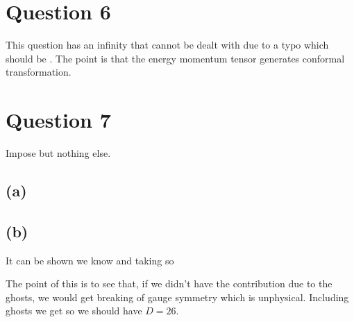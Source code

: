 \documentclass{article}
\begin{document}
\section*{Question 6}

This question has an infinity that cannot be dealt with due to a typo
which should be 
.
The point is that the energy momentum tensor generates conformal transformation. 


\section*{Question 7}

Impose 
but nothing else. 

\subsection*{(a)}


\subsection*{(b)}
It can be shown 
we know 
and taking 
so 

The point of this is to see that, if we didn't have the contribution due to the ghosts, we would get breaking of gauge symmetry which is unphysical. Including ghosts we get 
so we should have $D=26$. 
\end{document}
